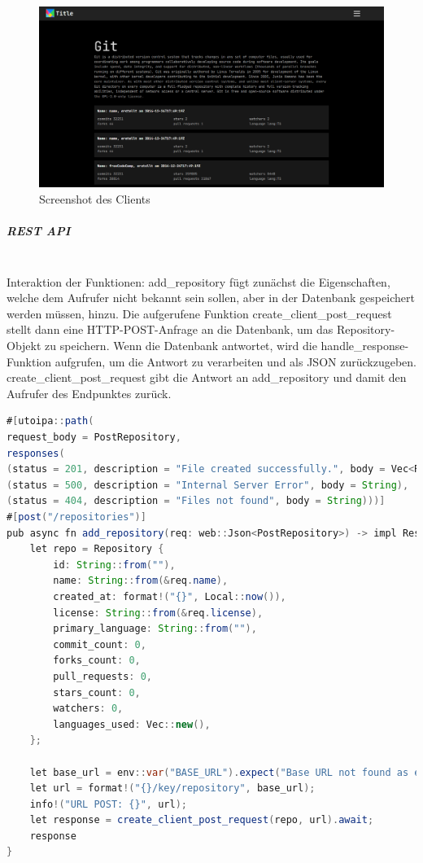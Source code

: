 \documentclass[notitlepage, hidelinks]{article}
\begin{document}
\begin{figure}[H]
\centering
  \includegraphics[width=\textwidth]{images/client.png}
  \caption{Screenshot des Clients}
  \label{fig:clientscreenshot}
\end{figure}

\subparagraph{REST API} \mbox{} \\

Interaktion der Funktionen: add\_repository fügt zunächst die Eigenschaften, welche dem Aufrufer nicht bekannt sein sollen, aber in der Datenbank gespeichert werden müssen, hinzu. Die aufgerufene Funktion create\_client\_post\_request stellt dann eine HTTP-POST-Anfrage an die Datenbank, um das Repository-Objekt zu speichern. Wenn die Datenbank antwortet, wird die handle\_response-Funktion aufgrufen, um die Antwort zu verarbeiten und als JSON zurückzugeben. create\_client\_post\_request gibt die Antwort an add\_repository und damit den Aufrufer des Endpunktes zurück. 

\begin{lstlisting}[language=Java,frame=single,caption=Programmatischer Endpunkt mit Dokumentation für Swagger (mit CodeGen),label=apione]
#[utoipa::path(
request_body = PostRepository,
responses(
(status = 201, description = "File created successfully.", body = Vec<ResponseInfo>),
(status = 500, description = "Internal Server Error", body = String),
(status = 404, description = "Files not found", body = String)))]
#[post("/repositories")]
pub async fn add_repository(req: web::Json<PostRepository>) -> impl Responder {
    let repo = Repository {
        id: String::from(""),
        name: String::from(&req.name),
        created_at: format!("{}", Local::now()),
        license: String::from(&req.license),
        primary_language: String::from(""),
        commit_count: 0,
        forks_count: 0,
        pull_requests: 0,
        stars_count: 0,
        watchers: 0,
        languages_used: Vec::new(),
    };

    let base_url = env::var("BASE_URL").expect("Base URL not found as environment variable");
    let url = format!("{}/key/repository", base_url);
    info!("URL POST: {}", url);
    let response = create_client_post_request(repo, url).await;
    response
}
\end{lstlisting}
\end{document}
